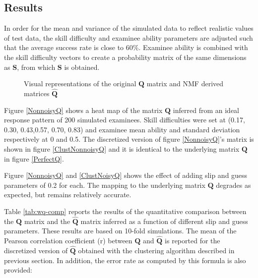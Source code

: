 \subsection{Results}


In order for the mean and variance of the simulated data to reflect realistic values of test data, the skill difficulty and examinee ability parameters are adjusted such that the average success rate is close to 60\%. Examinee ability is combined with the skill difficulty vectors to create a probability matrix of the same dimensions as $\mathbf{S}$, from which $\mathbf{S}$ is obtained.


\begin{figure}[!h]
\centering

\quad
\centering
{}\quad
\caption{Visual representations of the original $\mathbf{Q}$ matrix and NMF derived matrices $\hat{\mathbf{Q}}$}
\label{ClusteringResults}
\end{figure}


Figure \ref{NonnoisyQ} shows a heat map of the matrix $\mathbf{Q}$ inferred from an ideal response pattern of 200 simulated examinees. Skill difficulties were set at (0.17, 0.30, 0.43,0.57, 0.70, 0.83) and examinee mean ability and standard deviation respectively at 0 and 0.5. The discretized version of figure \ref{NonnoisyQ}\textquoteright{}s matrix is shown in figure \ref{ClustNonnoisyQ} and it is identical to the underlying matrix $\mathbf{Q}$ in figure \ref{PerfectQ}.

Figure \ref{NonnoisyQ} and \ref{ClustNoisyQ} shows the effect of adding slip and guess parameters of 0.2 for each. The mapping to the underlying matrix $\mathbf{Q}$ degrades as expected, but remains relatively accurate.

Table \ref{tab:wq-comp} reports the results of the quantitative comparison between the $\mathbf{Q}$ matrix and the $\hat{\mathbf{Q}}$ matrix inferred as a function of different slip and guess parameters. These results are based on 10-fold simulations. The mean of the Pearson correlation coefficient (r) between $\mathbf{Q}$ and $\hat{\mathbf{Q}}$ is reported for the discretized version of $\hat{\mathbf{Q}}$ obtained with the clustering algorithm described in previous section. In addition, the error rate as computed by this formula is also provided:


